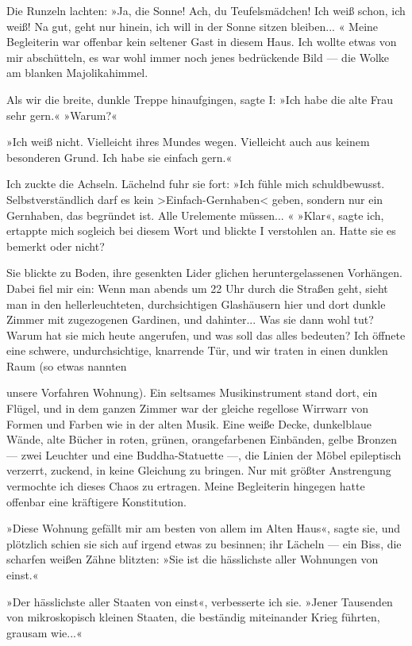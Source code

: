 Die Runzeln lachten: »Ja, die Sonne! Ach, du Teufelsmädchen! Ich
weiß schon, ich weiß! Na gut, geht nur hinein, ich will in der
Sonne sitzen bleiben... « Meine Begleiterin war offenbar kein
seltener Gast in diesem Haus. Ich wollte etwas von mir abschütteln,
es war wohl immer noch jenes bedrückende Bild — die Wolke am
blanken Majolikahimmel.

Als wir die breite, dunkle Treppe hinaufgingen, sagte I: »Ich habe
die alte Frau sehr gern.« »Warum?«

»Ich weiß nicht. Vielleicht ihres Mundes wegen. Vielleicht auch aus
keinem besonderen Grund. Ich habe sie einfach gern.«

Ich zuckte die Achseln. Lächelnd fuhr sie fort: »Ich fühle mich
schuldbewusst. Selbstverständlich darf es kein
\textgreater{}Einfach-Gernhaben\textless{} geben, sondern nur ein
Gernhaben, das begründet ist. Alle Urelemente müssen... « »Klar«,
sagte ich, ertappte mich sogleich bei diesem Wort und blickte I
verstohlen an. Hatte sie es bemerkt oder nicht?

Sie blickte zu Boden, ihre gesenkten Lider glichen
heruntergelassenen Vorhängen. Dabei fiel mir ein: Wenn man abends
um 22 Uhr durch die Straßen geht, sieht man in den
hellerleuchteten, durchsichtigen Glashäusern hier und dort dunkle
Zimmer mit zugezogenen Gardinen, und dahinter... Was sie dann wohl
tut? Warum hat sie mich heute angerufen, und was soll das alles
bedeuten? Ich öffnete eine schwere, undurchsichtige, knarrende Tür,
und wir traten in einen dunklen Raum (so etwas nannten

unsere Vorfahren Wohnung). Ein seltsames Musikinstrument stand
dort, ein Flügel, und in dem ganzen Zimmer war der gleiche
regellose Wirrwarr von Formen und Farben wie in der alten Musik.
Eine weiße Decke, dunkelblaue Wände, alte Bücher in roten, grünen,
orangefarbenen Einbänden, gelbe Bronzen — zwei Leuchter und eine
Buddha-Statuette —, die Linien der Möbel epileptisch verzerrt,
zuckend, in keine Gleichung zu bringen. Nur mit größter Anstrengung
vermochte ich dieses Chaos zu ertragen. Meine Begleiterin hingegen
hatte offenbar eine kräftigere Konstitution.

»Diese Wohnung gefällt mir am besten von allem im Alten Haus«,
sagte sie, und plötzlich schien sie sich auf irgend etwas zu
besinnen; ihr Lächeln — ein Biss, die scharfen weißen Zähne
blitzten: »Sie ist die hässlichste aller Wohnungen von einst.«

»Der hässlichste aller Staaten von einst«, verbesserte ich sie.
»Jener Tausenden von mikroskopisch kleinen Staaten, die beständig
miteinander Krieg führten, grausam wie...«

